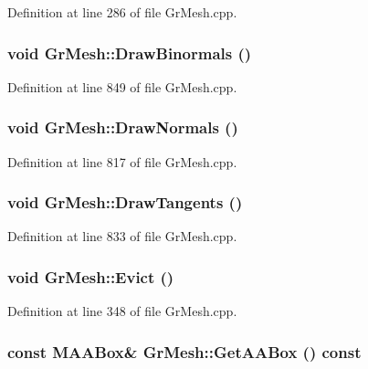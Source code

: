 Definition at line 286 of file GrMesh.cpp.\hypertarget{class_gr_mesh_a2f68d017f548b65b3a7a23cf451d71d}{
\subsubsection[{DrawBinormals}]{\setlength{\rightskip}{0pt plus 5cm}void GrMesh::DrawBinormals ()}}
\label{class_gr_mesh_a2f68d017f548b65b3a7a23cf451d71d}




Definition at line 849 of file GrMesh.cpp.\hypertarget{class_gr_mesh_68406b099ee7e6a796ba4ca230cb73a8}{
\subsubsection[{DrawNormals}]{\setlength{\rightskip}{0pt plus 5cm}void GrMesh::DrawNormals ()}}
\label{class_gr_mesh_68406b099ee7e6a796ba4ca230cb73a8}




Definition at line 817 of file GrMesh.cpp.\hypertarget{class_gr_mesh_04d6da4023764e8fad5e8824bf0bcb56}{
\subsubsection[{DrawTangents}]{\setlength{\rightskip}{0pt plus 5cm}void GrMesh::DrawTangents ()}}
\label{class_gr_mesh_04d6da4023764e8fad5e8824bf0bcb56}




Definition at line 833 of file GrMesh.cpp.\hypertarget{class_gr_mesh_6c86454dab1da04bdda47d7aa1dcf363}{
\subsubsection[{Evict}]{\setlength{\rightskip}{0pt plus 5cm}void GrMesh::Evict ()}}
\label{class_gr_mesh_6c86454dab1da04bdda47d7aa1dcf363}




Definition at line 348 of file GrMesh.cpp.\hypertarget{class_gr_mesh_bdf6308d6dad1cb3d3ca3330f0138049}{
\subsubsection[{GetAABox}]{\setlength{\rightskip}{0pt plus 5cm}const {\bf MAABox}\& GrMesh::GetAABox () const}}
\label{class_gr_mesh_bdf6308d6dad1cb3d3ca3330f0138049}




